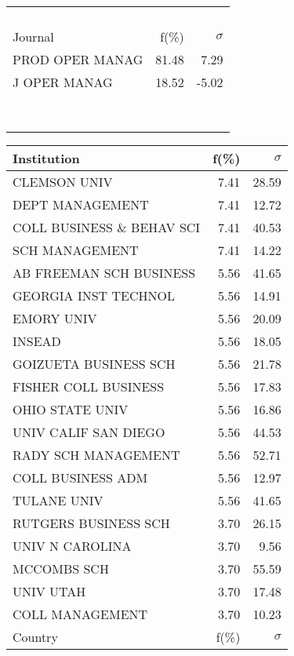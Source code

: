 \documentclass[a4paper,11pt]{report}
\begin{document}
\begin{landscape}
\begin{table}[!ht]
{\begin{tabular}{|l r  r|}
 &  & \\
 &  & \\
 &  & \\
 &  & \\
\hline
\hline
Journal & f(\%) & $\sigma$\\
\hline
PROD OPER MANAG & 81.48 & 7.29\\
J OPER MANAG & 18.52 & -5.02\\
 &  & \\
 &  & \\
 &  & \\
 &  & \\
 &  & \\
 &  & \\
 &  & \\
 &  & \\
\hline
\end{tabular}
}
{\scriptsize\begin{tabular}{|l r r|}
\hline
Institution & f(\%) & $\sigma$\\
\hline
CLEMSON UNIV & 7.41 & 28.59\\
DEPT MANAGEMENT & 7.41 & 12.72\\
COLL BUSINESS \& BEHAV SCI & 7.41 & 40.53\\
SCH MANAGEMENT & 7.41 & 14.22\\
AB FREEMAN SCH BUSINESS & 5.56 & 41.65\\
GEORGIA INST TECHNOL & 5.56 & 14.91\\
EMORY UNIV & 5.56 & 20.09\\
INSEAD & 5.56 & 18.05\\
GOIZUETA BUSINESS SCH & 5.56 & 21.78\\
FISHER COLL BUSINESS & 5.56 & 17.83\\
OHIO STATE UNIV & 5.56 & 16.86\\
UNIV CALIF SAN DIEGO & 5.56 & 44.53\\
RADY SCH MANAGEMENT & 5.56 & 52.71\\
COLL BUSINESS ADM & 5.56 & 12.97\\
TULANE UNIV & 5.56 & 41.65\\
RUTGERS BUSINESS SCH & 3.70 & 26.15\\
UNIV N CAROLINA & 3.70 & 9.56\\
MCCOMBS SCH & 3.70 & 55.59\\
UNIV UTAH & 3.70 & 17.48\\
COLL MANAGEMENT & 3.70 & 10.23\\
\hline
\hline
Country & f(\%) & $\sigma$\\

\end{tabular}}
\end{table}
\end{landscape}
\end{document}
